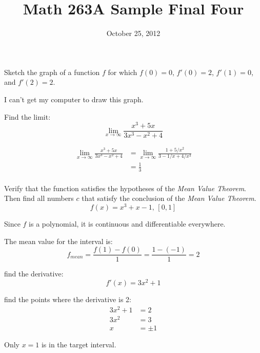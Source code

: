 \documentclass[fleqn,addpoints]{exam}
\title{Math 263A Sample Final Four}
\date{October 25, 2012}
\author{}
\begin{document}

\maketitle  

\begin{questions}

\question
Sketch the graph of a function $f$ for which $f(0) = 0$, $f'(0) = 2$, $f'(1) = 0$, and $f'(2) = 2$.

\begin{solution}
I can't get my computer to draw this graph.
\end{solution}


\question Find the limit:
\[
  \lim_{x \to \infty} \frac{x^3 + 5x}{3x^3 - x^2 + 4}
\]

\begin{solution}
\begin{align*}
  \lim_{x \to \infty} \frac{x^3 + 5x}{3x^3 - x^2 + 4} &=   \lim_{x \to \infty} \frac{1 + 5/x^2}{3 - 1/x + 4/x^3} \\
  &= \frac{1}{3} \\
\end{align*}
\end{solution}

\question Verify that the function satisfies the hypotheses of the {\em Mean Value Theorem}.  Then find all numbers $c$
that satisfy the conclusion of the {\em Mean Value Theorem}.
\[
  f(x) = x^3 + x - 1 \text{, } [0, 1]
\]

\begin{solution}
Since $f$ is a polynomial, it is continuous and differentiable everywhere.

The mean value for the interval is:
\[
  f_{mean} = \frac{f(1) - f(0)}{1} = \frac{1 - (-1)}{1} = 2
\]

find the derivative:
\[
  f'(x) = 3x^2 + 1
\]

find the points where the derivative is 2:
\begin{align*}
  3x^2 + 1 &= 2 \\
  3x^2 &= 3 \\
  x &= \pm 1
\end{align*}

Only $x = 1$ is in the target interval.

\end{solution}


\end{questions}
\end{document}
